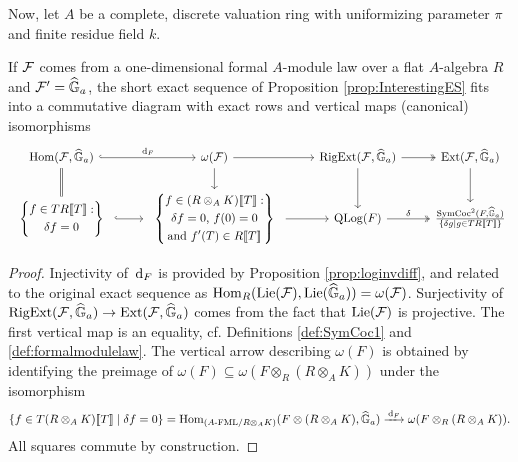 \documentclass[../main.tex]{subfiles}
\begin{document}
Now, let $A$ be a complete, discrete valuation ring with 
uniformizing parameter $\pi$ and finite residue field $k$. 
\begin{prop} \label{prop:ExplicitInterestingES}
  If $\mathcal{F}$ comes from a one-dimensional formal $A$-module law over a flat
  $A$-algebra $R$ and $\mathcal{F}' = \widehat{\mathbb{G}}_a$,
  the short exact sequence of Proposition \ref{prop:InterestingES}
  fits into a commutative diagram with 
  exact rows and vertical maps (canonical) isomorphisms
\begin{equation*}
\begin{tikzcd}[ampersand replacement=\&]
  {\Hom(\cF,\GG_a)} \& {\omega(\cF)} \& {\RigExt(\cF,\GG_a)} \&
  {\Ext(\cF,\GG_a)} \\ 
  \begin{array}{c} \left\{\begin{gathered} f \in TR\llbr T \rrbr : \\  \delta f
    = 0\end{gathered}  \right\} \end{array} \& \begin{array}{c}
    \left\{\begin{gathered} f \in (R\otimes_A K)\llbr T \rrbr : \\ 
  \text{$\delta f = 0$, $f(0) = 0$} \\
    \text{and $f'(T) \in R\llbr T \rrbr$}\end{gathered} \right\} \end{array} \& {\QLog(F)} \&
    {\frac{\SymCoc^2(F, \GG_a)}{\{\delta g \mid g \in T R\llbr T \rrbr\}}}
	\arrow[hook, "{\dc_F}", from=1-1, to=1-2]
	\arrow[Rightarrow, no head, from=1-1, to=2-1]
	\arrow[from=1-2, to=1-3]
	\arrow[from=1-2, to=2-2]
	\arrow[two heads, from=1-3, to=1-4]
	\arrow[from=1-3, to=2-3]
	\arrow[from=1-4, to=2-4]
	\arrow[hook, from=2-1, to=2-2]
	\arrow[from=2-2, to=2-3]
	\arrow["\delta", two heads, from=2-3, to=2-4]
\end{tikzcd}
\end{equation*}
\begin{proof}
  Injectivity of $\, \mathrm{d}_F$ is provided by Proposition \ref{prop:loginvdiff},
  and related to the original exact sequence as $\operatorname{Hom}_R(\operatorname{Lie}(\mathcal{F}), \operatorname{Lie}(\widehat{\mathbb{G}}_a)) = 
  \omega(\mathcal{F})$.
  Surjectivity of $\operatorname {RigExt}(\mathcal{F}, \widehat{\mathbb{G}}_a) \to \operatorname{Ext}(\mathcal{F}, \widehat{\mathbb{G}}_a)$ comes from the
  fact that $\operatorname{Lie}(\mathcal{F})$ is projective. 
  The first vertical map is an equality, cf. Definitions
  \ref{def:SymCoc1} and \ref{def:formalmodulelaw}. 
  The vertical arrow describing $\omega(F)$ is obtained by
  identifying the preimage of $\omega(F) \subseteq \omega(F \otimes_R (R
  \otimes_AK))$ under the isomorphism 
  \begin{equation*}
    \{f \in T(R \otimes_A K)\llbracket T \rrbracket \mid \delta f = 0\} = \operatorname{Hom}_{{({A}\text-\mathrm{FML}/{R \otimes_A K})}} (F \otimes (R \otimes_A K), \widehat{\mathbb{G}}_a) \xrightarrow{\, \mathrm{d}_F} \omega(F
    \otimes_R (R \otimes_AK)).
  \end{equation*}
  All squares commute by construction.
\end{proof}
\end{prop}
\end{document}
